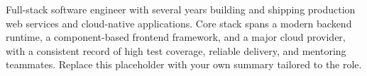 \noindent Full-stack software engineer with several years building and shipping production web services and cloud-native applications. Core stack spans a modern backend runtime, a component-based frontend framework, and a major cloud provider, with a consistent record of high test coverage, reliable delivery, and mentoring teammates. Replace this placeholder with your own summary tailored to the role.
\vspace{0.1em}

